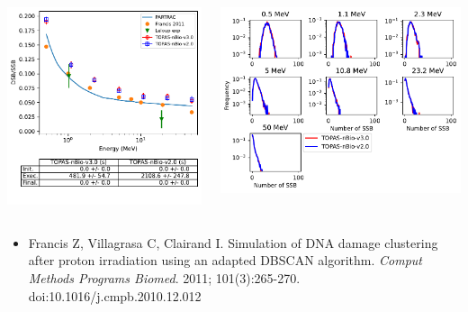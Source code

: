 \documentclass[aspectratio=1610]{beamer}
\begin{document}
\begin{frame}{\secname}
 \begin{columns}
  \begin{column}{0.4\linewidth}
   \includegraphics[width=1.1\textwidth]{./DBSCAN/DBSCAN2_g4em-dna_opt6}
  \end{column}
  \begin{column}{0.6\linewidth} 
   \includegraphics[width=\textwidth]{./DBSCAN/DBSCAN1_g4em-dna_opt6}
  \end{column}
 \end{columns}
\begin{itemize}
\item \tiny{Francis Z, Villagrasa C, Clairand I. Simulation of DNA damage clustering after proton irradiation using an adapted DBSCAN algorithm. \textit{Comput Methods Programs Biomed}. 2011; 101(3):265-270. doi:10.1016/j.cmpb.2010.12.012}
\end{itemize}
\end{frame}
\end{document}

